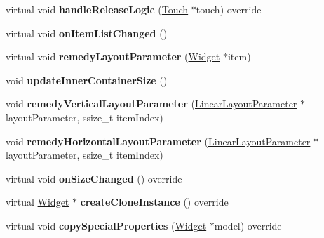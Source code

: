 \begin{DoxyCompactItemize}
\item 
\mbox{\label{classui_1_1ListView_a23e5fff6540df9164ef699bde392d8b8}} 
virtual void {\bfseries handle\+Release\+Logic} (\hyperlink{classTouch}{Touch} $\ast$touch) override
\item 
\mbox{\label{classui_1_1ListView_a718787483e872bb945172654fac68984}} 
virtual void {\bfseries on\+Item\+List\+Changed} ()
\item 
\mbox{\label{classui_1_1ListView_a0be47c080f65b39e68deb809ad22b9a3}} 
virtual void {\bfseries remedy\+Layout\+Parameter} (\hyperlink{classui_1_1Widget}{Widget} $\ast$item)
\item 
\mbox{\label{classui_1_1ListView_abc4959ce115171f988bad089f0ee900b}} 
void {\bfseries update\+Inner\+Container\+Size} ()
\item 
\mbox{\label{classui_1_1ListView_a4c9fc40aeb27c0c1361f7087b6b9fc16}} 
void {\bfseries remedy\+Vertical\+Layout\+Parameter} (\hyperlink{classui_1_1LinearLayoutParameter}{Linear\+Layout\+Parameter} $\ast$layout\+Parameter, ssize\+\_\+t item\+Index)
\item 
\mbox{\label{classui_1_1ListView_aaf5c944a246168c77a938a69275c1f27}} 
void {\bfseries remedy\+Horizontal\+Layout\+Parameter} (\hyperlink{classui_1_1LinearLayoutParameter}{Linear\+Layout\+Parameter} $\ast$layout\+Parameter, ssize\+\_\+t item\+Index)
\item 
\mbox{\label{classui_1_1ListView_ae5b8301dcf99c7f44484e3f997dd2bab}} 
virtual void {\bfseries on\+Size\+Changed} () override
\item 
\mbox{\label{classui_1_1ListView_a9f8169ee8e614fe9dcd7a2441fe75a34}} 
virtual \hyperlink{classui_1_1Widget}{Widget} $\ast$ {\bfseries create\+Clone\+Instance} () override
\item 
\mbox{\label{classui_1_1ListView_ab665d74509682e351623bff3e6b9e349}} 
virtual void {\bfseries copy\+Special\+Properties} (\hyperlink{classui_1_1Widget}{Widget} $\ast$model) override

\end{DoxyCompactItemize}
